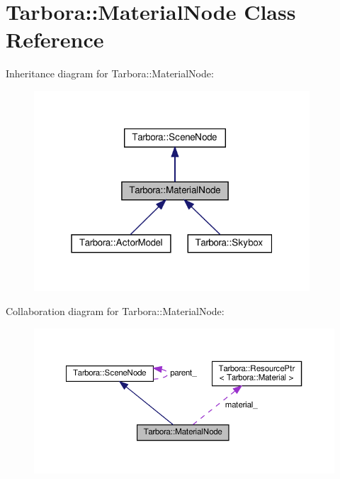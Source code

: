 \hypertarget{classTarbora_1_1MaterialNode}{}\section{Tarbora\+:\+:Material\+Node Class Reference}
\label{classTarbora_1_1MaterialNode}


Inheritance diagram for Tarbora\+:\+:Material\+Node\+:\nopagebreak
\begin{figure}[H]
\begin{center}
\leavevmode
\includegraphics[width=292pt]{classTarbora_1_1MaterialNode__inherit__graph}
\end{center}
\end{figure}


Collaboration diagram for Tarbora\+:\+:Material\+Node\+:\nopagebreak
\begin{figure}[H]
\begin{center}
\leavevmode
\includegraphics[width=350pt]{classTarbora_1_1MaterialNode__coll__graph}
\end{center}
\end{figure}
